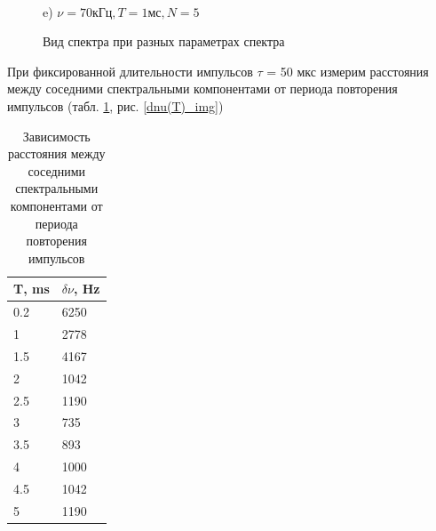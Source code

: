 \documentclass[a4paper,12pt]{article} %
\begin{document}
\begin{figure}[h!]
\begin{minipage}[h!]{0.47\linewidth}
 \\e) $\nu = 70 кГц, T = 1 мс, N = 5$
\end{minipage}
\caption{Вид спектра при разных параметрах спектра}
\label{спектр_цуги}
\end{figure}

При фиксированной длительности импульсов $\tau$ = 50 мкс измерим расстояния между соседними спектральными компонентами от периода повторения импульсов (табл. \ref{dnu(T)_tbl}, рис. \ref{dnu(T)_img})

\begin{table}[h!]
\caption{Зависимость расстояния между соседними спектральными компонентами от периода повторения импульсов} \label{dnu(T)_tbl}
\begin{tabular}{|l|l|}
\hline
T, ms & $\delta \nu$, Hz \\ \hline
0.2   & 6250    \\ \hline
1     & 2778    \\ \hline
1.5   & 4167    \\ \hline
2     & 1042    \\ \hline
2.5   & 1190    \\ \hline
3     & 735     \\ \hline
3.5   & 893     \\ \hline
4     & 1000    \\ \hline
4.5   & 1042    \\ \hline
5     & 1190    \\ \hline
\end{tabular}
\end{table}
\end{document}
